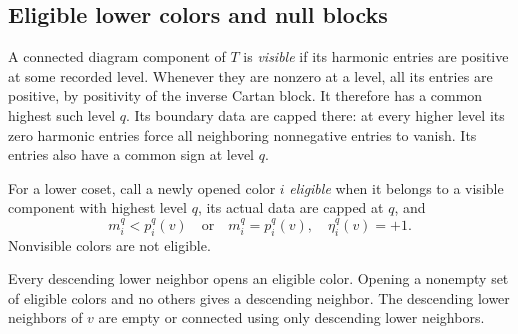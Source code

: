 \subsection{Eligible lower colors and null blocks}

A connected diagram component of \(T\) is \emph{visible} if its harmonic
entries are positive at some recorded level.
Whenever they are nonzero at a level, all its entries are positive,
by positivity of the inverse Cartan block.
It therefore has a common highest such level \(q\).
Its boundary data are capped there: at every higher level its zero
harmonic entries force all neighboring nonnegative entries to vanish.
Its entries also have a common sign at level \(q\).

For a lower coset, call a newly opened color \(i\) \emph{eligible} when
it belongs to a visible component with highest level \(q\), its actual
data are capped at \(q\), and
\begin{equation}
 m_i^q<p_i^q(v)
 \quad\text{or}\quad
 m_i^q=p_i^q(v),\quad \eta_i^q(v)=+1.
 \label{ht:eligible}
\end{equation}
Nonvisible colors are not eligible.

\begin{lemma}
\label{ht:lower}
Every descending lower neighbor opens an eligible color.
Opening a nonempty set of eligible colors and no others gives a
descending neighbor.  The descending lower neighbors of \(v\) are
empty or connected using only descending lower neighbors.
\end{lemma}

